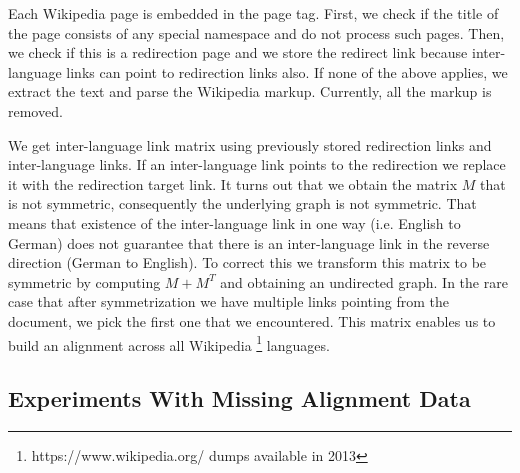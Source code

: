 \documentclass[twoside,11pt]{article}
\begin{document}
Each Wikipedia page is embedded in the page tag. First, we check if the title of the page consists of any special namespace and do not process such pages. Then, we check if this is a redirection page and we store the redirect link because inter-language links can point to redirection links also. If none of the above applies, we extract the text and parse the Wikipedia markup. Currently, all the markup is removed.

We get inter-language link matrix using previously stored redirection links and inter-language links. If an inter-language link points to the redirection we replace it with the redirection target link. It turns out that we obtain the matrix $M$ that is not symmetric, consequently the underlying graph is not symmetric. That means that existence of the inter-language link in one way (i.e. English to German) does not guarantee that there is an inter-language link in the reverse direction (German to English). To correct this we transform this matrix to be symmetric by computing $M+M^T$ and obtaining an undirected graph. In the rare case that after symmetrization we have multiple links pointing from the document, we pick the first one that we encountered. This matrix enables us to build an alignment across all Wikipedia \footnote{https://www.wikipedia.org/ dumps available in 2013} languages.

\subsection{Experiments With Missing Alignment Data}\label{experiments:hubcca}
\end{document}
